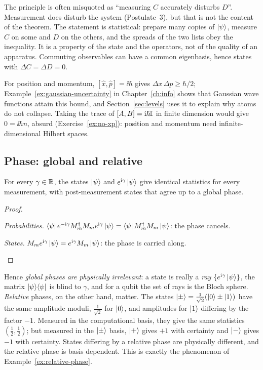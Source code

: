 \begin{pitfall}
  The principle is often misquoted as ``measuring $C$ accurately disturbs $D$''. Measurement does disturb the system (Postulate~3), but that is not the content of the theorem. The statement is statistical: prepare many copies of $\left|\psi\right\rangle$, measure $C$ on some and $D$ on the others, and the spreads of the two lists obey the inequality.
  It is a property of the state and the operators, not of the quality of an apparatus. Commuting observables can have a common eigenbasis, hence states with $\Delta C=\Delta D=0$.
\end{pitfall}

For position and momentum, $[\hat x,\hat p]=\ii\hbar$ gives $\Delta x\,\Delta p\ge\hbar/2$; Example~\ref{ex:gaussian-uncertainty} in Chapter~\ref{ch:info} shows that Gaussian wave functions attain this bound, and Section~\ref{sec:levels} uses it to explain why atoms do not collapse. Taking the trace of $[A,B]=\mathrm{i}\hbar\mathbb{I}$ in finite dimension would give $0=\ii\hbar n$, absurd (Exercise~\ref{ex:no-xp}): position and momentum need infinite-dimensional Hilbert spaces.

\subsection{Phase: global and relative}\label{sec:phase-global}

\begin{proposition}\label{prop:global-phase}
  For every $\gamma\in\mathbb{R}$, the states $\left|\psi\right\rangle$ and $e^{\mathrm{i}\gamma}\left|\psi\right\rangle$ give identical statistics for every measurement, with post-measurement states that agree up to a global phase.
\end{proposition}
\begin{proof}
  \begin{steps}
    \item \emph{Probabilities.} $\left\langle\psi\right| e^{-\mathrm{i}\gamma}M_m^\dagger M_me^{\mathrm{i}\gamma}\left|\psi\right\rangle=\left\langle\psi\right| M_m^\dagger M_m\left|\psi\right\rangle$: the phase cancels.
    \item \emph{States.} $M_me^{\mathrm{i}\gamma}\left|\psi\right\rangle=e^{\mathrm{i}\gamma}M_m\left|\psi\right\rangle$: the phase is carried along. \qedhere
  \end{steps}
\end{proof}

Hence \emph{global phases are physically irrelevant}: a state is really a \emph{ray} $\{e^{\mathrm{i}\gamma}\left|\psi\right\rangle\}$, the matrix $\left|\psi\right\rangle\!\left\langle\psi\right|$ is blind to $\gamma$, and for a qubit the set of rays is the Bloch sphere. \emph{Relative} phases, on the other hand, matter. The states $\left|\pm\right\rangle=\frac1{\sqrt2}(\left|0\right\rangle\pm\left|1\right\rangle)$ have the same amplitude moduli, $\frac1{\sqrt2}$ for $\left|0\right\rangle$, and amplitudes for $\left|1\right\rangle$ differing by the factor $-1$.
Measured in the computational basis, they give the same statistics $(\tfrac12,\tfrac12)$; but measured in the $\left|\pm\right\rangle$ basis, $\left|+\right\rangle$ gives $+1$ with certainty and $\left|-\right\rangle$ gives $-1$ with certainty. States differing by a relative phase are physically different, and the relative phase is basis dependent. This is exactly the phenomenon of Example~\ref{ex:relative-phase}.

